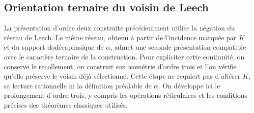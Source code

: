


\subsection{Orientation ternaire du voisin de Leech}
\label{x_reciprocidad:km:orden-tres-reticular}

La présentation d’ordre deux construite précédemment utilise la négation
du réseau de Leech. Le même réseau, obtenu à partir de l’incidence marquée
par \(K\) et du support dodécaphasique de \(\alpha\), admet une seconde
présentation compatible avec le caractère ternaire de la construction.
Pour expliciter cette continuité, on conserve le recollement, on construit
son isométrie d’ordre trois et l’on vérifie qu’elle préserve le voisin déjà
sélectionné. Cette étape ne requiert pas d’altérer \(K\), sa lecture rationnelle ni
la définition préalable de \(\alpha\). On développe ici le prolongement d’ordre trois, y compris les opérations
réticulaires et les conditions précises des théorèmes classiques utilisés.


